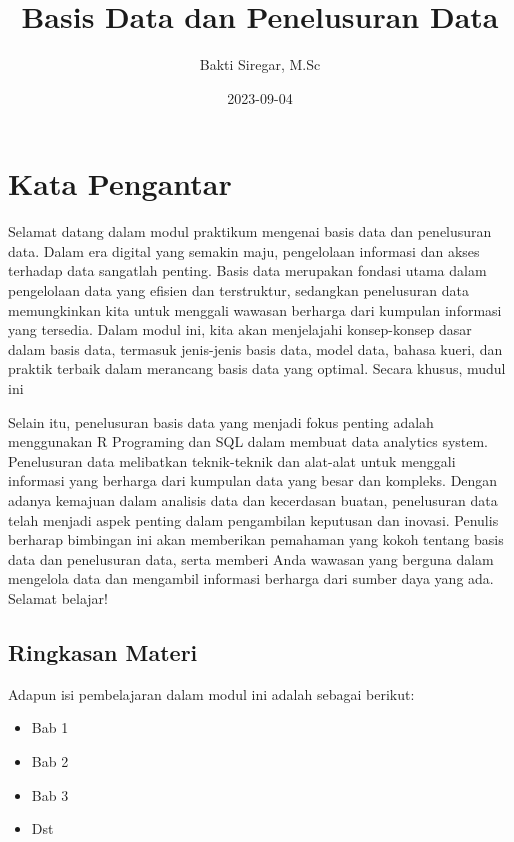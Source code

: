 \documentclass[
]{book}
\title{Basis Data dan Penelusuran Data}
\author{Bakti Siregar, M.Sc}
\date{2023-09-04}
\providecommand{\tightlist}{%
  \setlength{\itemsep}{0pt}\setlength{\parskip}{0pt}}
\begin{document}
\maketitle

{
\setcounter{tocdepth}{1}
\tableofcontents
}
\hypertarget{kata-pengantar}{%
\chapter*{Kata Pengantar}\label{kata-pengantar}}

Selamat datang dalam modul praktikum mengenai basis data dan penelusuran data. Dalam era digital yang semakin maju, pengelolaan informasi dan akses terhadap data sangatlah penting. Basis data merupakan fondasi utama dalam pengelolaan data yang efisien dan terstruktur, sedangkan penelusuran data memungkinkan kita untuk menggali wawasan berharga dari kumpulan informasi yang tersedia. Dalam modul ini, kita akan menjelajahi konsep-konsep dasar dalam basis data, termasuk jenis-jenis basis data, model data, bahasa kueri, dan praktik terbaik dalam merancang basis data yang optimal. Secara khusus, mudul ini

Selain itu, penelusuran basis data yang menjadi fokus penting adalah menggunakan R Programing dan SQL dalam membuat data analytics system. Penelusuran data melibatkan teknik-teknik dan alat-alat untuk menggali informasi yang berharga dari kumpulan data yang besar dan kompleks. Dengan adanya kemajuan dalam analisis data dan kecerdasan buatan, penelusuran data telah menjadi aspek penting dalam pengambilan keputusan dan inovasi. Penulis berharap bimbingan ini akan memberikan pemahaman yang kokoh tentang basis data dan penelusuran data, serta memberi Anda wawasan yang berguna dalam mengelola data dan mengambil informasi berharga dari sumber daya yang ada. Selamat belajar!

\hypertarget{ringkasan-materi}{%
\section*{Ringkasan Materi}\label{ringkasan-materi}}

Adapun isi pembelajaran dalam modul ini adalah sebagai berikut:

\begin{itemize}
\tightlist
\item
  Bab 1
\item
  Bab 2
\item
  Bab 3
\item
  Dst
\end{itemize}
\end{document}

